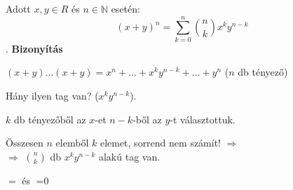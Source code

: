 \begin{frame}
  \begin{tcolorbox}[title={Tétel: Binomiális tétel}]
    Adott $x, y \in R$ és $n \in \mathbb{N}$ esetén:\\
    $$(x + y)^n = \sum_{k = 0}^n {n \choose k} x^ky^{n - k}$$.
  \tcblower
    \textbf{Bizonyítás}\\
    \mmedskip

    $(x + y) ... (x + y) = x^n + ... + x^ky^{n - k} + ... + y^n$ ($n$ db tényező)\\
    \mmedskip

    Hány ilyen tag van? ($x^ky^{n - k}$).\\
    \mmedskip

    $k$ db tényezőből az $x$-et $n - k$-ből az $y$-t választottuk.\\
    \msmallskip
    
    Összesen $n$ elemből $k$ elemet, sorrend nem számít! $\Rightarrow$\\
    $\Rightarrow$ ${n \choose k}$ db $x^ky^{n - k}$ alakú tag van.
  \end{tcolorbox}


  \begin{tcolorbox}[title={Tétel: Következmény (Binomiális tétel)}]
    $\displaystyle \mathop{\sum_{k = 0}^n {n \choose k} = 2^n}$ és $\displaystyle \mathop{\sum_{i = 0}^n {n \choose k} (-1)^k = 0}$
  \end{tcolorbox}
\end{frame}

